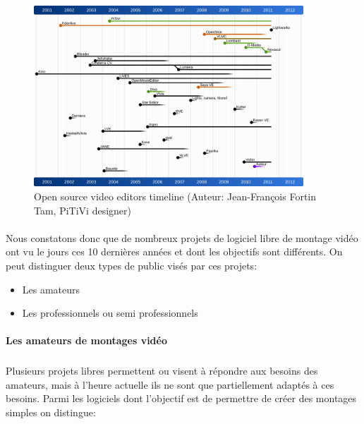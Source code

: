 \begin{figure} [h]
  \begin{center}
    \includegraphics[width=0.9\textwidth]{images/open-source-video-editor-timeline}
  \end{center} \caption{Open source video editors timeline (Auteur:
  Jean-François Fortin Tam, PiTiVi designer)} \label{Yes}
\end{figure}

\paragraph{ }

Nous constatons donc que de nombreux projets de logiciel libre de montage
vidéo ont vu le jours ces 10 dernières années et dont les objectifs
sont différents. On peut distinguer deux types de public visés par
ces projets:

\begin {itemize}

  \item {Les amateurs}

  \item {Les professionnels ou semi professionnels}
\end {itemize}

\newpage\paragraph {Les amateurs de montages vidéo}

\subparagraph{}

Plusieurs projets libres permettent ou visent à répondre aux besoins
des amateurs, mais à l'heure actuelle ils ne sont que partiellement
adaptés à ces besoins. Parmi les logiciels dont l'objectif est de
permettre de créer des montages simples on distingue:

